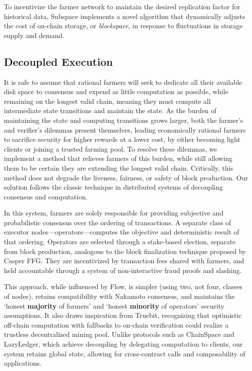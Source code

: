\documentclass[conference]{IEEEtran}
\begin{document}
To incentivize the farmer network to maintain the desired replication factor for historical data, Subspace implements a novel algorithm that dynamically adjusts the cost of on-chain storage, or \textit{blockspace}, in response to fluctuations in storage supply and demand.

\subsection{Decoupled Execution}
\label{sec:decex}
It is safe to assume that rational farmers will seek to dedicate all their available disk space to consensus and expend as little computation as possible, while remaining on the longest valid chain, meaning they must compute all intermediate state transitions and maintain the state. As the burden of maintaining the state and computing transitions grows larger, both the farmer’s and verifier’s dilemmas present themselves, leading economically rational farmers to sacrifice security for higher rewards at a lower cost, by either becoming light clients or joining a trusted farming pool. To resolve these dilemmas, we implement a method that relieves farmers of this burden, while still allowing them to be certain they are extending the longest valid chain. Critically, this method does not degrade the liveness, fairness, or safety of block production. Our solution follows the classic technique in distributed systems of decoupling consensus and computation.

In this system, farmers are solely responsible for providing subjective and probabilistic consensus over the ordering of transactions. A separate class of executor nodes—operators—computes the objective and deterministic result of that ordering. Operators are selected through a stake-based election, separate from block production, analogous to the block finalization technique proposed by Casper FFG\cite{casper}. They are incentivized by transaction fees shared with farmers, and held accountable through a system of non-interactive fraud proofs\cite{albassam2018} and slashing\cite{buterin2014}.

This approach, while influenced by Flow\cite{flow1, flow2, flow3}, is simpler (using two, not four, classes of nodes), retains compatibility with Nakamoto consensus, and maintains the `honest \textbf{majority} of farmers' and `honest \textbf{minority} of operators' security assumptions. It also draws inspiration from Truebit\cite{truebit}, recognizing that optimistic off-chain computation with fallbacks to on-chain verification could realize a trustless decentralized mining pool. Unlike protocols such as ChainSpace\cite{chainspace} and LazyLedger\cite{lazyledger}, which achieve decoupling by delegating computation to clients, our system retains global state, allowing for cross-contract calls and composability of applications.
\end{document}
